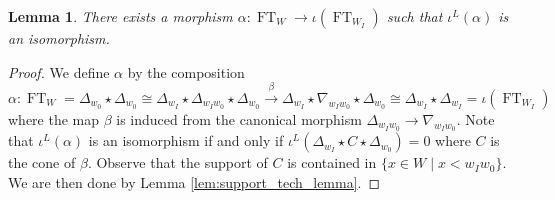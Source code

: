 \documentclass{amsart}
\newtheorem{lemma}{Lemma}[section]
\theoremstyle{definition}
\DeclareMathOperator{\FT}{FT}
\begin{document}
        \begin{lemma}\label{lem:restr_of_rel_counit}
                There exists a morphism $\alpha : \FT_W \to \iota (\FT_{W_I})$ such that $\iota^L (\alpha)$ is an isomorphism.
        \end{lemma}
        \begin{proof}
                We define $\alpha$ by the composition
                \[\alpha : \FT_W = \Delta_{w_0} \star \Delta_{w_0} \cong \Delta_{w_I} \star \Delta_{w_I w_0} \star \Delta_{w_0} \stackrel{\beta}{\to} \Delta_{w_I} \star \nabla_{w_I w_0} \star \Delta_{w_0} \cong \Delta_{w_I} \star \Delta_{w_I} = \iota (\FT_{W_I})\]
                where the map $\beta$ is induced from the canonical morphism $\Delta_{w_I w_0} \to \nabla_{w_I w_0}$.
                Note that $\iota^L (\alpha)$ is an isomorphism if and only if $\iota^L (\Delta_{w_I} \star C \star \Delta_{w_0}) = 0$ where $C$ is the cone of $\beta$.
                Observe that the support of $C$ is contained in $\{x \in W \mid x < w_I w_0\}$. We are then done by Lemma \ref{lem:support_tech_lemma}.
        \end{proof}
\end{document}
